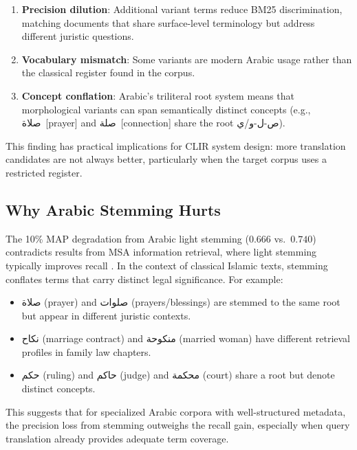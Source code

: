 \documentclass[preprint,12pt,numbers]{elsarticle}
\newcommand{\ar}[1]{{\arabicfont #1}}
\begin{document}
\begin{enumerate}
    \item \textbf{Precision dilution}: Additional variant terms reduce BM25 discrimination, matching documents that share surface-level terminology but address different juristic questions.

    \item \textbf{Vocabulary mismatch}: Some variants are modern Arabic usage rather than the classical register found in the corpus.

    \item \textbf{Concept conflation}: Arabic's triliteral root system means that morphological variants can span semantically distinct concepts (e.g., \ar{صلاة}~[prayer] and \ar{صلة}~[connection] share the root \ar{ص}-\ar{ل}-\ar{و}/\ar{ي}).
\end{enumerate}

This finding has practical implications for CLIR system design: more translation candidates are not always better, particularly when the target corpus uses a restricted register.

\subsection{Why Arabic Stemming Hurts}

The 10\% MAP degradation from Arabic light stemming ($0.666$ vs.\ $0.740$) contradicts results from MSA information retrieval, where light stemming typically improves recall \citep{larkey2007light}. In the context of classical Islamic texts, stemming conflates terms that carry distinct legal significance. For example:

\begin{itemize}
    \item \ar{صلاة} (prayer) and \ar{صلوات} (prayers/blessings) are stemmed to the same root but appear in different juristic contexts.
    \item \ar{نكاح} (marriage contract) and \ar{منكوحة} (married woman) have different retrieval profiles in family law chapters.
    \item \ar{حكم} (ruling) and \ar{حاكم} (judge) and \ar{محكمة} (court) share a root but denote distinct concepts.
\end{itemize}

This suggests that for specialized Arabic corpora with well-structured metadata, the precision loss from stemming outweighs the recall gain, especially when query translation already provides adequate term coverage.
\end{document}
